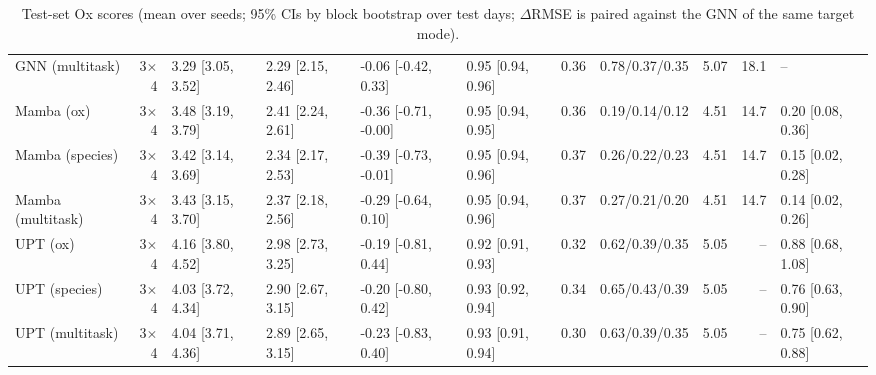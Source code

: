 \begin{table}[t]
\begin{tabular}{lrllllrlrrl}
GNN (multitask) & 3$\times$4 & 3.29 \scriptsize[3.05, 3.52] & 2.29 \scriptsize[2.15, 2.46] & -0.06 \scriptsize[-0.42, 0.33] & 0.95 \scriptsize[0.94, 0.96] & 0.36 & 0.78/0.37/0.35 & 5.07 & 18.1 & -- \\
Mamba (ox) & 3$\times$4 & 3.48 \scriptsize[3.19, 3.79] & 2.41 \scriptsize[2.24, 2.61] & -0.36 \scriptsize[-0.71, -0.00] & 0.95 \scriptsize[0.94, 0.95] & 0.36 & 0.19/0.14/0.12 & 4.51 & 14.7 & 0.20 \scriptsize[0.08, 0.36] \\
Mamba (species) & 3$\times$4 & 3.42 \scriptsize[3.14, 3.69] & 2.34 \scriptsize[2.17, 2.53] & -0.39 \scriptsize[-0.73, -0.01] & 0.95 \scriptsize[0.94, 0.96] & 0.37 & 0.26/0.22/0.23 & 4.51 & 14.7 & 0.15 \scriptsize[0.02, 0.28] \\
Mamba (multitask) & 3$\times$4 & 3.43 \scriptsize[3.15, 3.70] & 2.37 \scriptsize[2.18, 2.56] & -0.29 \scriptsize[-0.64, 0.10] & 0.95 \scriptsize[0.94, 0.96] & 0.37 & 0.27/0.21/0.20 & 4.51 & 14.7 & 0.14 \scriptsize[0.02, 0.26] \\
UPT (ox) & 3$\times$4 & 4.16 \scriptsize[3.80, 4.52] & 2.98 \scriptsize[2.73, 3.25] & -0.19 \scriptsize[-0.81, 0.44] & 0.92 \scriptsize[0.91, 0.93] & 0.32 & 0.62/0.39/0.35 & 5.05 & -- & 0.88 \scriptsize[0.68, 1.08] \\
UPT (species) & 3$\times$4 & 4.03 \scriptsize[3.72, 4.34] & 2.90 \scriptsize[2.67, 3.15] & -0.20 \scriptsize[-0.80, 0.42] & 0.93 \scriptsize[0.92, 0.94] & 0.34 & 0.65/0.43/0.39 & 5.05 & -- & 0.76 \scriptsize[0.63, 0.90] \\
UPT (multitask) & 3$\times$4 & 4.04 \scriptsize[3.71, 4.36] & 2.89 \scriptsize[2.65, 3.15] & -0.23 \scriptsize[-0.83, 0.40] & 0.93 \scriptsize[0.91, 0.94] & 0.30 & 0.63/0.39/0.35 & 5.05 & -- & 0.75 \scriptsize[0.62, 0.88] \\
\bottomrule
\end{tabular}
\caption{Test-set Ox scores (mean over seeds; 95\% CIs by block bootstrap over test days; $\Delta$RMSE is paired against the GNN of the same target mode).}
\label{tab:benchmark}
\end{table}
